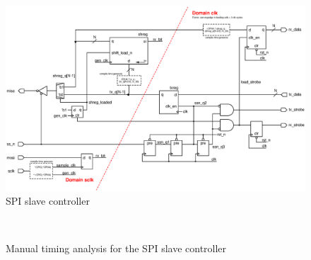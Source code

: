 \documentclass[]{article}
\begin{document}
\begin{figure}[h!]
    \centering
    \includegraphics[width=\linewidth]{../gfx/spi_slave.eps}
    \caption{SPI slave controller}
    \label{fig:spi_slave}
\end{figure}

\begin{figure}[h!]
    \centering
    \\
    \caption{Manual timing analysis for the SPI slave controller}
    \label{fig:spi_timing}
\end{figure}
\end{document}
